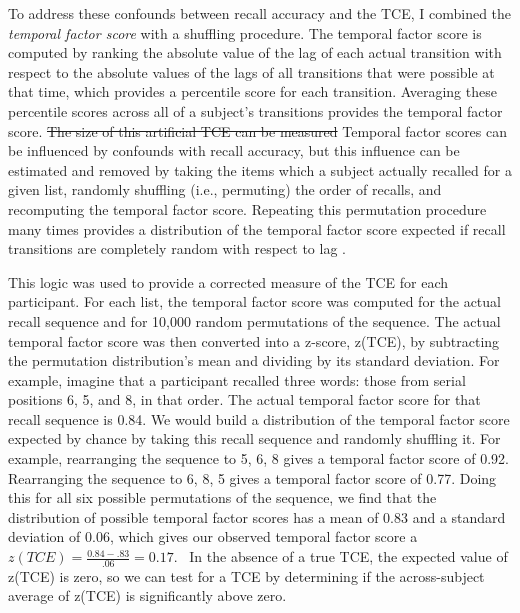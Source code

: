 \documentclass[man,natbib,floatsintext]{apa6} %
\begin{document}
To address these confounds between recall accuracy and the TCE, I combined the \emph{temporal factor score} \citep{SedeEtal10,PolyEtal09} with a shuffling procedure\color{black}. The temporal factor score is computed by ranking the absolute value of the lag of each actual transition with respect to the absolute values of the lags of all transitions that were possible at that time, which provides a percentile score for each transition. Averaging these percentile scores across all of a subject's transitions provides the temporal factor score.
\st{The size of this artificial TCE can be measured} \color{red}Temporal factor scores can be influenced by confounds with recall accuracy, but this influence can be estimated and removed \color{black} by taking the items which a subject actually recalled for a given list, randomly shuffling (i.e., permuting) the order of recalls, and recomputing the temporal factor score. Repeating this permutation procedure many times provides a distribution of the temporal factor score expected if recall transitions are completely random with respect to lag \citep{HealKaha17}. 

This logic was used to provide a corrected measure of the TCE for each participant. For each list, the temporal factor score was computed for the actual recall sequence and for 10,000 random permutations of the sequence. The actual temporal factor score was then converted into a z-score, z(TCE), by subtracting the permutation distribution's mean and dividing by its standard deviation.  \color{red}\label{TCEex} For example, imagine that a participant recalled three words: those from serial positions 6, 5, and 8, in that order. The actual temporal factor score for that recall sequence is 0.84. We would build a distribution of the temporal factor score expected by chance by taking this recall sequence and randomly shuffling it. For example, rearranging the sequence to 5, 6, 8 gives a temporal factor score of 0.92. Rearranging the sequence to 6, 8, 5 gives a temporal factor score of 0.77. Doing this for all six possible permutations of the sequence, we find that the distribution of possible temporal factor scores has a mean of 0.83 and a standard deviation of 0.06, which gives our observed temporal factor score a $z(TCE)=\frac{0.84-.83}{.06}=0.17$. \color{black}~In the absence of a true TCE, the expected value of z(TCE) is zero, so we can test for a TCE by determining if the across-subject average of z(TCE) is significantly above zero. %
\end{document}
